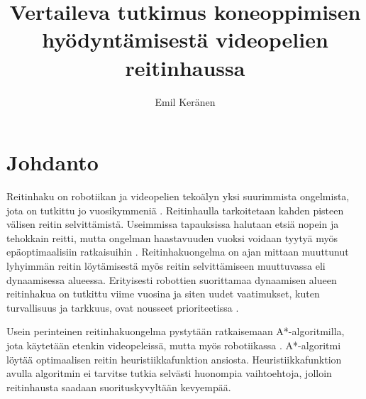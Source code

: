 \documentclass[utf8]{gradu3}
\begin{document}
\title{Vertaileva tutkimus koneoppimisen hyödyntämisestä videopelien reitinhaussa}

\author{Emil Keränen}

\maketitle

\bigskip

\mainmatter

\chapter{Johdanto}

Reitinhaku on robotiikan ja videopelien tekoälyn yksi suurimmista ongelmista, jota on tutkittu jo vuosikymmeniä \parencite{abd2015comprehensive,cui2011based}. Reitinhaulla tarkoitetaan kahden pisteen välisen reitin selvittämistä. Useimmissa tapauksissa halutaan etsiä nopein ja tehokkain reitti, mutta ongelman haastavuuden vuoksi voidaan tyytyä myös epäoptimaalisiin ratkaisuihin \parencite{rahmani2022towards}. Reitinhakuongelma on ajan mittaan muuttunut lyhyimmän reitin löytämisestä myös reitin selvittämiseen muuttuvassa eli dynaamisessa alueessa. Erityisesti robottien suorittamaa dynaamisen alueen reitinhakua on tutkittu viime vuosina ja siten uudet vaatimukset, kuten turvallisuus ja tarkkuus, ovat nousseet prioriteetissa \parencite{karur2021survey}.

Usein perinteinen reitinhakuongelma pystytään ratkaisemaan A*-algoritmilla, jota käytetään etenkin videopeleissä, mutta myös robotiikassa \parencite{abd2015comprehensive,botea2013pathfinding,cui2011based}. A*-algoritmi löytää optimaalisen reitin heuristiikkafunktion ansiosta. Heuristiikkafunktion avulla algoritmin ei tarvitse tutkia selvästi huonompia vaihtoehtoja, jolloin reitinhausta saadaan suorituskyvyltään kevyempää.
\end{document}
